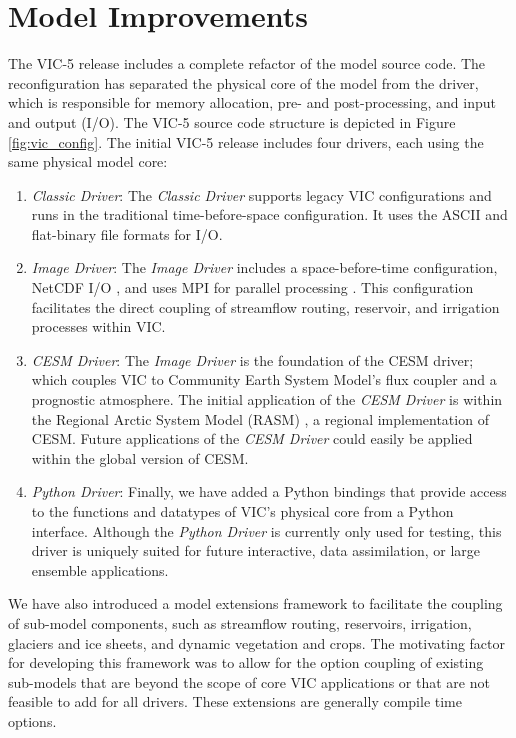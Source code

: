 \documentclass[gmd, manuscript]{copernicus}
\begin{document}
\section{Model Improvements}
  \label{sec:improvements}
  The VIC-5 release includes a complete refactor of the model source code.
  The reconfiguration has separated the physical core of the model from the driver, which is responsible for memory allocation, pre- and post-processing, and input and output (I/O).
  The VIC-5 source code structure is depicted in Figure \ref{fig:vic_config}.
  The initial VIC-5 release includes four drivers, each using the same physical model core:
  \begin{enumerate}
    \item \textit{Classic Driver}: The \textit{Classic Driver} supports legacy VIC configurations and runs in the traditional time-before-space configuration.
    It uses the ASCII and flat-binary file formats for I/O.
    \item \textit{Image Driver}: The \textit{Image Driver} includes a space-before-time configuration, NetCDF I/O \citep{Rew_1990}, and uses MPI for parallel processing \citep{Gropp_1996}.
    This configuration facilitates the direct coupling of streamflow routing, reservoir, and irrigation processes within VIC.
    \item \textit{CESM Driver}: The \textit{Image Driver} is the foundation of the CESM driver; which couples VIC to Community Earth System Model's \citep[CESM;][]{Hurrell_2013} flux coupler \citep[CPL7;][]{Craig_2012} and a prognostic atmosphere.
    The initial application of the \textit{CESM Driver} is within the Regional Arctic System Model (RASM) \citep{Hamman_2016a}, a regional implementation of CESM.
    Future applications of the \textit{CESM Driver} could easily be applied within the global version of CESM.
    \item \textit{Python Driver}: Finally, we have added a Python bindings that provide access to the functions and datatypes of VIC’s physical core from a Python interface.
    Although the \textit{Python Driver} is currently only used for testing, this driver is uniquely suited for future interactive, data assimilation, or large ensemble applications.
  \end{enumerate}

  We have also introduced a model extensions framework to facilitate the coupling of sub-model components, such as streamflow routing, reservoirs, irrigation, glaciers and ice sheets, and dynamic vegetation and crops.
  The motivating factor for developing this framework was to allow for the option coupling of existing sub-models that are beyond the scope of core VIC applications or that are not feasible to add for all drivers.
  These extensions are generally compile time options.
\end{document}
